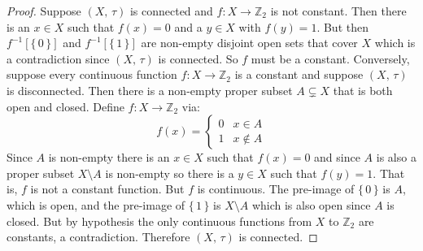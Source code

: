 \documentclass{article}
\theoremstyle{plain}
\theoremstyle{normal}
\begin{document}
        \begin{proof}
            Suppose $(X,\,\tau)$ is connected and $f:X\rightarrow\mathbb{Z}_{2}$
            is not constant. Then there is an $x\in{X}$ such that
            $f(x)=0$ and a $y\in{X}$ with $f(y)=1$. But then
            $f^{-1}[\{\,0\,\}]$ and $f^{-1}[\{\,1\,\}]$ are non-empty disjoint
            open sets that cover $X$ which is a contradiction since $(X,\,\tau)$
            is connected. So $f$ must be a constant. Conversely, suppose every
            continuous function $f:X\rightarrow\mathbb{Z}_{2}$ is a constant
            and suppose $(X,\,\tau)$ is disconnected. Then there is a non-empty
            proper subset $A\subsetneq{X}$ that is both open and closed.
            Define $f:X\rightarrow\mathbb{Z}_{2}$ via:
            \begin{equation}
                f(x)=
                \begin{cases}
                    0&x\in{A}\\
                    1&x\notin{A}
                \end{cases}
            \end{equation}
            Since $A$ is non-empty there is an $x\in{X}$ such that $f(x)=0$ and
            since $A$ is also a proper subset $X\setminus{A}$ is non-empty so
            there is a $y\in{X}$ such that $f(y)=1$. That is, $f$ is not a
            constant function. But $f$ is continuous. The pre-image of
            $\{\,0\,\}$ is $A$, which is open, and the pre-image of $\{\,1\,\}$
            is $X\setminus{A}$ which is also open since $A$ is closed. But by
            hypothesis the only continuous functions from $X$ to
            $\mathbb{Z}_{2}$ are constants, a contradiction. Therefore
            $(X,\,\tau)$ is connected.
        \end{proof}
\end{document}
